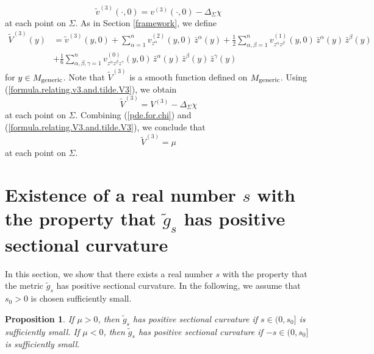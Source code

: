 \documentclass[11pt]{amsart}
\newtheorem{proposition}[theorem]{Proposition}
\theoremstyle{definition}
\begin{document}
\begin{equation}
\label{formula.relating.v3.and.tilde.V3}
\tilde{v}^{(3)}(\cdot,0) = v^{(3)}(\cdot,0) - \Delta_\Sigma \chi 
\end{equation} 
at each point on $\Sigma$. As in Section \ref{framework}, we define 
\begin{align*} 
\tilde{V}^{(3)}(y) 
&= \tilde{v}^{(3)}(y,0) + \sum_{\alpha=1}^n v^{(2)}_{z^\alpha}(y,0) \, \bar{z}^\alpha(y) + \frac{1}{2} \sum_{\alpha,\beta=1}^n v^{(1)}_{z^\alpha z^\beta}(y,0) \, \bar{z}^\alpha(y) \, \bar{z}^\beta(y) \\ 
&+ \frac{1}{6} \sum_{\alpha,\beta,\gamma=1}^n v^{(0)}_{z^\alpha z^\beta z^\gamma}(y,0) \, \bar{z}^\alpha(y) \, \bar{z}^\beta(y) \, \bar{z}^\gamma(y) 
\end{align*}
for $y \in M_{\text{\rm generic}}$. Note that $\tilde{V}^{(3)}$ is a smooth function defined on $M_{\text{\rm generic}}$. Using (\ref{formula.relating.v3.and.tilde.V3}), we obtain 
\begin{equation} 
\label{formula.relating.V3.and.tilde.V3}
\tilde{V}^{(3)} = V^{(3)} - \Delta_\Sigma \chi
\end{equation}
at each point on $\Sigma$. Combining (\ref{pde.for.chi}) and (\ref{formula.relating.V3.and.tilde.V3}), we conclude that 
\begin{equation} 
\label{formula.for.tilde.V3}
\tilde{V}^{(3)} = \mu 
\end{equation}
at each point on $\Sigma$.

\section{Existence of a real number $s$ with the property that $\tilde{g}_s$ has positive sectional curvature}

In this section, we show that there exists a real number $s$ with the property that the metric $\tilde{g}_s$ has positive sectional curvature. In the following, we assume that $s_0 > 0$ is chosen sufficiently small. 

\begin{proposition}
\label{positivity.of.sectional.curvature}
If $\mu > 0$, then $\tilde{g}_s$ has positive sectional curvature if $s \in (0,s_0]$ is sufficiently small. If $\mu < 0$, then $\tilde{g}_s$ has positive sectional curvature if $-s \in (0,s_0]$ is sufficiently small. 
\end{proposition}
\end{document}
